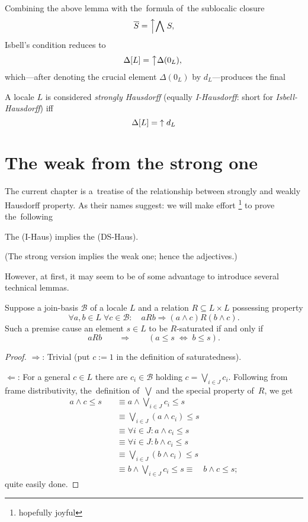 Combining the above lemma with the~formula of~the sublocalic closure
\[
  \overline{S} = \left\uparrow \bigwedge \right. S,
\]
Isbell's condition reduces to
\[
  \Delta[L] = \left\uparrow \Delta(0_L),\right.
\]
which---after denoting the crucial element $\Delta(0_L)$ by $d_L$---produces
the final

\begin{framed}
  \begin{df}[I-Haus]
    A locale $L$ is considered \emph{strongly Hausdorff\/} (equally
    \emph{I-Hausdorff}: short for \emph{Isbell-Hausdorff}) iff
    \[
      \Delta[L] = \left\uparrow\right. d_L
    \]
  \end{df}
\end{framed}

\section{The weak from the strong one}

The current chapter is a~treatise of the relationship between strongly and
weakly Hausdorff property.
As their names suggest: we will make effort%
\footnote{hopefully joyful}
to prove the~following

\begin{thm} \label{IHaus->DSHaus}
  The (I-Haus) implies the (DS-Haus).
\end{thm}
(The strong version implies the weak one; hence the adjectives.)

However, at first, it may seem to be of some advantage to introduce several
technical lemmas.

\begin{lem}
  Suppose a join-basis $\mathcal{B}$ of a locale $L$ and a relation $R
  \subseteq L \times L$ possessing property
  \[
    \forall a, b\in L \; \forall c \in \mathcal{B}: \quad aRb \Rightarrow (a
    \wedge c)R(b \wedge c).
  \]
  Such a premise cause an element $s\in L$ to be $R$-saturated if and only if
  \[
    aRb \qquad \Rightarrow \qquad (a \leq s \; \Leftrightarrow \; b \leq s).
  \]
\end{lem}
\begin{proof}
  $\Rightarrow$: Trivial (put $c := 1$ in the definition of saturatedness).

  $\Leftarrow$: For a general $c\in L$ there are $c_i\in \mathcal{B}$ holding
  $c = \bigvee_{i\in J} c_i$.
  Following from frame distributivity, the~definition of~$\bigvee$ and the
  special property of~$R$, we get
  \begin{align*}
    a \wedge c \leq s \quad
    &\equiv a \wedge \bigvee_{i\in J} c_i \leq s \\
    &\equiv \bigvee_{i\in J} (a \wedge c_i) \leq s \\
    &\equiv \forall i\in J: a \wedge c_i \leq s \\
    &\equiv \forall i\in J: b \wedge c_i \leq s \\
    &\equiv \bigvee_{i\in J} (b \wedge c_i) \leq s \\
    &\equiv b \wedge \bigvee_{i\in J} c_i \leq s
    \equiv \quad b \wedge c \leq s;
  \end{align*}
  quite easily done.
\end{proof}

